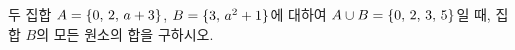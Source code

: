 두 집합 $A=\{0,\mkern3mu 2,\mkern3mu a+3\}$, $B=\{3,\mkern3mu a^2+1\}$에 대하여 $A\cup B=\{0,\mkern3mu 2,\mkern3mu 3,\mkern3mu 5\}$일 때, 집합 $B$의 모든 원소의 합을 구하시오. 
